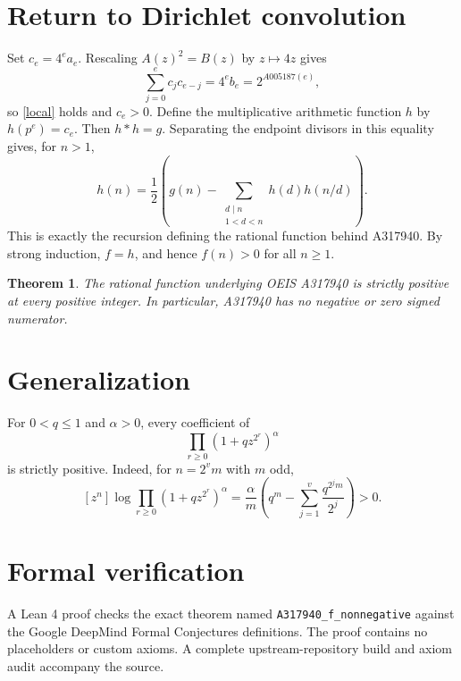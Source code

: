 \documentclass[11pt]{article}
\newtheorem{theorem}{Theorem}
\begin{document}
\section{Return to Dirichlet convolution}
Set $c_e=4^ea_e$. Rescaling $A(z)^2=B(z)$ by $z\mapsto4z$ gives
\[
\sum_{j=0}^{e}c_jc_{e-j}=4^eb_e=2^{A005187(e)},
\]
so \eqref{local} holds and $c_e>0$.
Define the multiplicative arithmetic function $h$ by $h(p^e)=c_e$.
Then $h*h=g$. Separating the endpoint divisors in this equality gives, for $n>1$,
\[
h(n)=\frac12\left(g(n)-\sum_{\substack{d\mid n\\1<d<n}}h(d)h(n/d)\right).
\]
This is exactly the recursion defining the rational function behind A317940. By strong induction, $f=h$, and hence $f(n)>0$ for all $n\ge1$.

\begin{theorem}
The rational function underlying OEIS A317940 is strictly positive at every positive integer. In particular, A317940 has no negative or zero signed numerator.
\end{theorem}

\section{Generalization}
For $0<q\le1$ and $\alpha>0$, every coefficient of
\[
\prod_{r\ge0}(1+qz^{2^r})^\alpha
\]
is strictly positive. Indeed, for $n=2^vm$ with $m$ odd,
\[
[z^n]\log\prod_{r\ge0}(1+qz^{2^r})^\alpha
=\frac{\alpha}{m}\left(q^m-\sum_{j=1}^{v}\frac{q^{2^jm}}{2^j}\right)>0.
\]

\section*{Formal verification}
A Lean 4 proof checks the exact theorem named \texttt{A317940\_f\_nonnegative} against the Google DeepMind Formal Conjectures definitions. The proof contains no placeholders or custom axioms. A complete upstream-repository build and axiom audit accompany the source.
\end{document}
